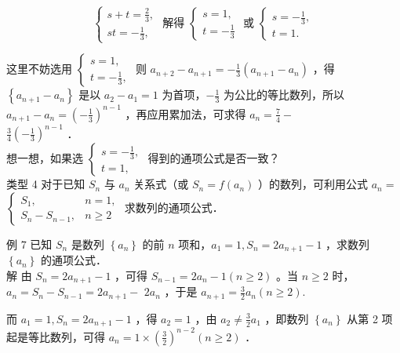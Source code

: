 \documentclass[10pt]{article}
\begin{document}
\[
\left\{\begin{array} { l } 
{ s + t = \frac { 2 } { 3 } , } \\
{ s t = - \frac { 1 } { 3 } , }
\end{array} \text { 解得 } \left\{\begin{array} { l } 
{ s = 1 , } \\
{ t = - \frac { 1 } { 3 } }
\end{array} \text { 或 } \left\{\begin{array}{l}
s=-\frac{1}{3}, \\
t=1 .
\end{array}\right.\right.\right.
\]

这里不妨选用 \(\left\{\begin{array}{l}s=1, \\ t=-\frac{1}{3},\end{array}\right.\) 则 \(a_{n+2}-a_{n+1}=-\frac{1}{3}\left(a_{n+1}-a_{n}\right)\) ，得 \(\left\{a_{n+1}-a_{n}\right\}\) 是以 \(a_{2}-a_{1}=1\) 为首项，\(-\frac{1}{3}\) 为公比的等比数列，所以 \(a_{n+1}-a_{n}=\left(-\frac{1}{3}\right)^{n-1}\) ，再应用累加法，可求得 \(a_{n}=\frac{7}{4}-\)\\
\(\frac{3}{4}\left(-\frac{1}{3}\right)^{n-1}\) ．\\
想一想，如果选 \(\left\{\begin{array}{l}s=-\frac{1}{3}, \\ t=1,\end{array}\right.\) 得到的通项公式是否一致？\\
类型 4 对于已知 \(S_{n}\) 与 \(a_{n}\) 关系式（或 \(S_{n}=f\left(a_{n}\right)\) ）的数列，可利用公式 \(a_{n}=\) \(\left\{\begin{array}{ll}S_{1}, & n=1, \\ S_{n}-S_{n-1}, & n \geqslant 2\end{array}\right.\) 求数列的通项公式．

例 7 已知 \(S_{n}\) 是数列 \(\left\{a_{n}\right\}\) 的前 \(n\) 项和，\(a_{1}=1, S_{n}=2 a_{n+1}-1\) ，求数列 \(\left\{a_{n}\right\}\) 的通项公式．\\
解 由 \(S_{n}=2 a_{n+1}-1\) ，可得 \(S_{n-1}=2 a_{n}-1(n \geqslant 2)\) 。当 \(n \geqslant 2\) 时，\(a_{n}=S_{n}-S_{n-1}=2 a_{n+1}-\) \(2 a_{n}\) ，于是 \(a_{n+1}=\frac{3}{2} a_{n}(n \geqslant 2)\).

而 \(a_{1}=1, S_{n}=2 a_{n+1}-1\) ，得 \(a_{2}=1\) ，由 \(a_{2} \neq \frac{3}{2} a_{1}\) ，即数列 \(\left\{a_{n}\right\}\) 从第 2 项起是等比数列，可得 \(a_{n}=1 \times\left(\frac{3}{2}\right)^{n-2}(n \geqslant 2)\) ．
\end{document}
